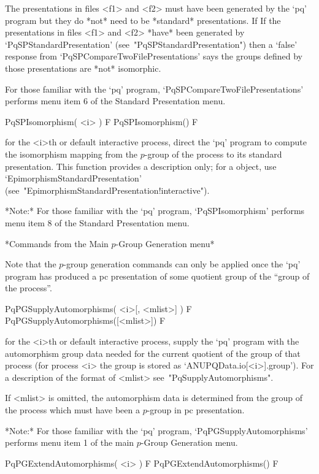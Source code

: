 The presentations in files <f1> and  <f2> must have been generated by the
`pq' program but they do *not* need to be *standard* presentations. If If
the  presentations  in files  <f1>  and  <f2>  *have* been  generated  by
`PqSPStandardPresentation'    (see~"PqSPStandardPresentation")   then   a
`false' response  from `PqSPCompareTwoFilePresentations' says  the groups
defined by those presentations are *not* isomorphic.

For      those      familiar      with       the       `pq'       program,
`PqSPCompareTwoFilePresentations' performs menu item 6  of  the  Standard
Presentation menu.

\>PqSPIsomorphism( <i> ) F
\>PqSPIsomorphism() F

for the <i>th or default interactive {\ANUPQ} process,  direct  the  `pq'
program to compute the isomorphism mapping  from  the  $p$-group  of  the
process  to  its  standard  presentation.  This   function   provides   a
description      only;      for      a      {\GAP}      object,       use
`EpimorphismStandardPresentation'
(see~"EpimorphismStandardPresentation!interactive").

*Note:* For  those  familiar  with  the  `pq'  program,  `PqSPIsomorphism'
performs menu item 8 of the Standard Presentation menu.

*Commands from the Main $p$-Group Generation menu*

Note that the $p$-group generation commands can only be applied once  the
`pq' program has produced a pc presentation of some quotient group of the
``group of the process''.

\>PqPGSupplyAutomorphisms( <i>[, <mlist>] ) F
\>PqPGSupplyAutomorphisms([<mlist>]) F

for the  <i>th or default  interactive {\ANUPQ} process, supply  the `pq'
program with the automorphism group  data needed for the current quotient
of the  group of  that process (for  process <i>  the group is  stored as
`ANUPQData.io[<i>].group').  For  a description of the  format of <mlist>
see~"PqSupplyAutomorphisms".

If <mlist> is omitted, the automorphism data is determined from the group
of  the process  which must  have been  a $p$-group  in  pc presentation.

*Note:*
For  those  familiar  with  the  `pq'  program,  `PqPGSupplyAutomorphisms'
performs menu item 1 of the main $p$-Group Generation menu.

\>PqPGExtendAutomorphisms( <i> ) F
\>PqPGExtendAutomorphisms() F

